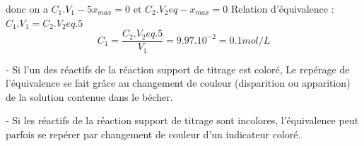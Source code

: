 \documentclass[12pt]{article}
\begin{document}
donc on a  $C_1.V_1 - 5x_{max} = 0 $ et $C_2.V_2eq - x_{max} = 0 $ Relation d'équivalence : $C_1.V_1 = C_2.V_2eq.5$ 
$$C_1 = \frac{C_2.V_2eq.5}{V_1} = 9.97.10^{-2} = 0.1 mol/L$$



\begin{tcolorbox}[colback=pink!10!white,
                  colframe=blue!15!gray,
                  title=Conclusion : 
                 ]


- Si l’un des réactifs de la réaction support de titrage est coloré, Le repérage de l'équivalence se fait grâce au
changement de couleur (disparition ou apparition) de la solution contenue dans le bécher.

- Si les réactifs de la réaction support de titrage sont incolores, l’équivalence peut parfois se
repérer par changement de couleur d’un indicateur coloré.


\end{tcolorbox}
\end{document}

